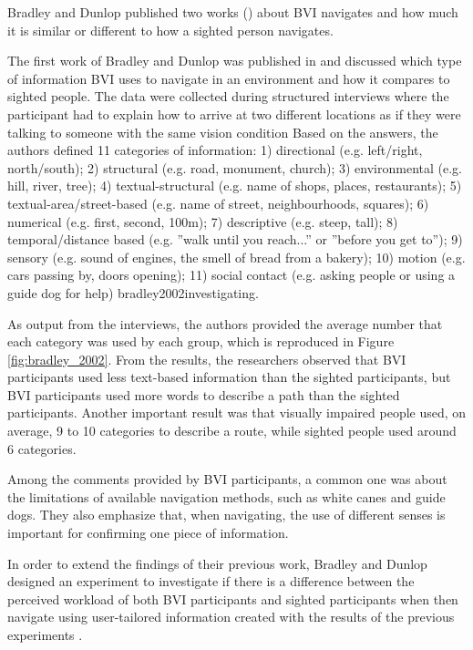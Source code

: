 Bradley and Dunlop published two works (\citeyear{bradley2002investigating,bradley2005experimental}) about BVI navigates and how much it is similar or different to how a sighted person navigates. 

The first work of Bradley and Dunlop was published in \citeyear{bradley2002experimental} and discussed which type of information BVI uses to navigate in an environment and how it compares to sighted people. The data were collected during structured interviews where the participant had to explain how to arrive at two different locations as if they were talking to someone with the same vision condition \cite{bradley2002investigating}
\citeyear{}
Based on the answers, the authors defined 11 categories of information: 1) directional (e.g. left/right, north/south); 2) structural (e.g. road, monument, church); 3) environmental (e.g. hill, river, tree); 4) textual-structural (e.g. name of shops, places, restaurants); 5) textual-area/street-based (e.g. name of street, neighbourhoods, squares); 6) numerical (e.g. first, second, 100m); 7) descriptive (e.g. steep, tall); 8) temporal/distance based (e.g. ”walk until you reach...” or ”before you get to”); 9) sensory (e.g. sound of engines, the smell of bread from a bakery); 10) motion (e.g. cars passing by, doors opening); 11) social contact (e.g. asking people or using a guide dog for help) {bradley2002investigating}.

As output from the interviews, the authors provided the average number that each category was used by each group, which is reproduced in Figure \ref{fig:bradley_2002}. From the results, the researchers observed that BVI participants used less text-based information than the sighted participants, but BVI participants used more words to describe a path than the sighted participants. Another important result was that visually impaired people used, on average, 9 to 10 categories to describe a route, while sighted people used around 6 categories.



Among the comments provided by BVI participants, a common one was about the limitations of available navigation methods, such as white canes and guide dogs. They also emphasize that, when navigating, the use of different senses is important for confirming one piece of information. 

In order to extend the findings of their previous work, Bradley and Dunlop designed an experiment to investigate if there is a difference between the perceived workload of both BVI participants and sighted participants when then navigate using user-tailored information created with the results of the previous experiments \cite{bradley2005experimental}.

